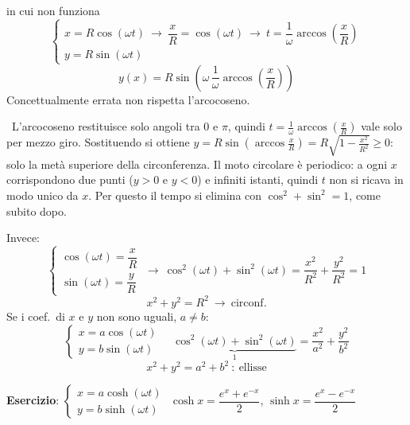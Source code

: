 \documentclass[11pt,a4paper,openany]{report}
\begin{document}
\begin{esempio}{in cui non funziona}
\[
  \begin{cases}
    x = R\cos(\omega t) \ \to\ \dfrac{x}{R} = \cos(\omega t) \ \to\ t = \dfrac{1}{\omega}\arccos\!\left(\dfrac{x}{R}\right)\\[1ex]
    y = R\sin(\omega t)
  \end{cases}
\]
\[
  y(x) = R\sin\!\left(\omega\,\frac{1}{\omega}\arccos\!\left(\frac{x}{R}\right)\right)
\]
Concettualmente errata \implica non rispetta l'arcocoseno.

\begin{delucidazione}
\aggiunto\ L'arcocoseno restituisce solo angoli tra $0$ e $\pi$, quindi
$t = \frac{1}{\omega}\arccos\!\left(\frac{x}{R}\right)$ vale solo per mezzo giro.
Sostituendo si ottiene $y = R\sin\!\left(\arccos\frac{x}{R}\right) = R\sqrt{1 - \frac{x^2}{R^2}} \geq 0$:
solo la metà superiore della circonferenza.
Il moto circolare è periodico: a ogni $x$ corrispondono due punti ($y > 0$ e $y < 0$) e infiniti istanti,
quindi $t$ non si ricava in modo unico da $x$. Per questo il tempo si elimina con
$\cos^2 + \sin^2 = 1$, come subito dopo.
\end{delucidazione}

Invece:
\[
  \begin{cases}
    \cos(\omega t) = \dfrac{x}{R} \\[1ex]
    \sin(\omega t) = \dfrac{y}{R}
  \end{cases}
  \ \to\ \cos^2(\omega t) + \sin^2(\omega t) = \frac{x^2}{R^2} + \frac{y^2}{R^2} = 1
\]
\[
  x^2 + y^2 = R^2 \ \to\ \text{circonf.}
\]
Se i coef.\ di $x$ e $y$ non sono uguali, $a \neq b$:
\[
  \begin{cases}
    x = a\cos(\omega t) \\
    y = b\sin(\omega t)
  \end{cases}
  \quad
  \underbrace{\cos^2(\omega t) + \sin^2(\omega t)}_{1} = \frac{x^2}{a^2} + \frac{y^2}{b^2}
\]
\[
  x^2 + y^2 = a^2 + b^2 \ : \ \text{ellisse}
\]
\end{esempio}

\begin{delucidazione}
\textbf{Esercizio}:
$\begin{cases} x = a\cosh(\omega t) \\ y = b\sinh(\omega t) \end{cases}$
\qquad
$\cosh x = \dfrac{e^x + e^{-x}}{2}$, \quad $\sinh x = \dfrac{e^x - e^{-x}}{2}$
\end{delucidazione}
\end{document}
